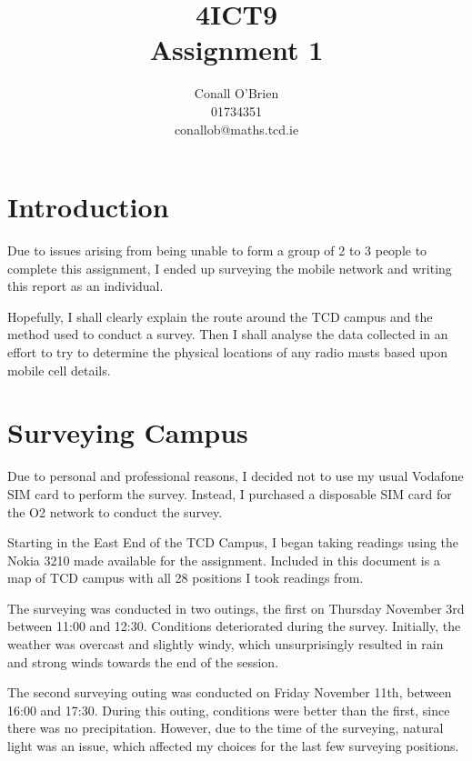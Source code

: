 \documentclass[a4paper,12pt]{article}
\begin{document}
\title{4ICT9 \\ Assignment 1}

\author{Conall O'Brien \\ 01734351 \\ conallob@maths.tcd.ie}

\maketitle

\section{Introduction}

Due to issues arising from being unable to form a group of 2 to 3 people to complete
this assignment, I ended up surveying the mobile network and writing
this report as an individual.


Hopefully, I shall clearly explain the route around the TCD campus and
the method used to conduct a survey. Then I shall analyse the data
collected in an effort to try to determine the physical locations of any
radio masts based upon mobile cell details.

\section{Surveying Campus}

Due to personal and professional reasons, I decided not to use my usual
Vodafone SIM card to perform the survey. Instead, I purchased a
disposable SIM card for the O2 network to conduct the survey.


Starting in the East End of the TCD Campus, I began taking readings
using the Nokia 3210 made available for the assignment. Included in this
document is a map of TCD campus with all 28 positions I took readings from.


The surveying was conducted in two outings, the first on Thursday
November 3rd between 11:00 and 12:30. Conditions deteriorated during the
survey. Initially, the weather was overcast and slightly windy, which
unsurprisingly resulted in rain and strong winds towards the end of the
session.


The second surveying outing was conducted on Friday November 11th,
between 16:00 and 17:30. During this outing, conditions were better than
the first, since there was no precipitation. However, due to the time of
the surveying, natural light was an issue, which affected my choices for
the last few surveying positions.
\end{document}
